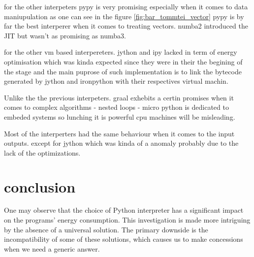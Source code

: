 for the other interpeters pypy is very promising especially when it comes to data maniupulation as one can see in the figure \ref{fig:bar_tommtei_vector}
pypy is by far the best interperer when it comes to treating vectors.
numba2 introduced the JIT but wasn't as promising as numba3.

for the other vm based interpereters. jython and ipy lacked in term of energy optimisation which was kinda expected since they were in their the begining of the stage and the main puprose of such implementation is to link the bytecode generated by jython and ironpython with their respectives virtual machin.

Unlike the the previous interpeters. graal exhebits a certin promises when it comes to complex algorithms - nested loops -
micro python is dedicated to embeded systems so lunching it is powerful cpu machines will be misleading.

Most of the interperters had the same behaviour when it comes to the input outputs. except for jython which was kinda of a anomaly probably due to the lack of the optimizations.


\section{conclusion}
One may observe that the choice of Python interpreter has a significant impact on the programs' energy consumption.
This investigation is made more intriguing by the absence of a universal solution.
The primary downside is the incompatibility of some of these solutions, which causes us to make concessions when we need a generic answer.



